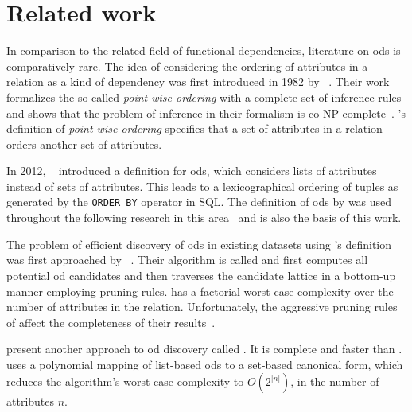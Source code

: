 
\section{Related work}\label{sec:related_work}

In comparison to the related field of functional dependencies, literature on \glspl{od} is comparatively rare.
The idea of considering the ordering of attributes in a relation as a kind of dependency was first introduced in 1982 by \citeauthor{ginsburg}~\cite{ginsburg}.
Their work formalizes the so-called \textit{point-wise ordering} with a complete set of inference rules and shows that the problem of inference in their formalism is co-NP-complete~\cite{ginsburg}.
\citeauthor{ginsburg}'s definition of \textit{point-wise ordering} specifies that a set of attributes in a relation orders another set of attributes.

In 2012, \citeauthor{szlichta:fundamentals}~\cite{szlichta:fundamentals} introduced a definition for \glspl{od}, which considers lists of attributes instead of sets of attributes.
This leads to a lexicographical ordering of tuples as generated by the \texttt{ORDER BY} operator in SQL.
The definition of \glspl{od} by \citeauthor{szlichta:fundamentals} was used throughout the following research in this area~\cite{consonni, langer, szlichta:discovery} and is also the basis of this work.

The problem of efficient discovery of \glspl{od} in existing datasets using \citeauthor{szlichta:fundamentals}'s definition was first approached by \citeauthor{langer}~\cite{langer}.
Their algorithm is called \order{} and first computes all potential \gls{od} candidates and then traverses the candidate lattice in a bottom-up manner employing pruning rules.
\order{} has a factorial worst-case complexity over the number of attributes in the relation.
Unfortunately, the aggressive pruning rules of \order{} affect the completeness of their results~\cite{szlichta:discovery}.

\citeauthor{szlichta:discovery} present another approach to \gls{od} discovery called \fastod{}.
It is complete and faster than \order{}.
\fastod{} uses a polynomial mapping of list-based \glspl{od} to a set-based canonical form, which reduces the algorithm's worst-case complexity to $O(2^{\left|n\right|})$, in the number of attributes $n$.

